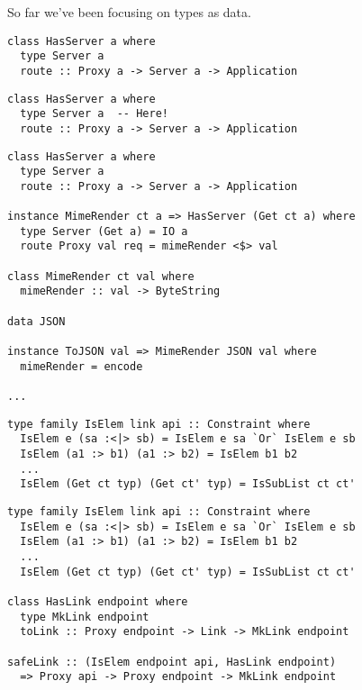 \documentclass{beamer}
\begin{document}
\begin{frame}
So far we've been focusing on types as data.
\end{frame}

\begin{frame}[fragile]
\begin{verbatim}
class HasServer a where
  type Server a
  route :: Proxy a -> Server a -> Application

\end{verbatim}
\end{frame}

\begin{frame}[fragile]
\begin{verbatim}
class HasServer a where
  type Server a  -- Here!
  route :: Proxy a -> Server a -> Application

\end{verbatim}
\end{frame}

\begin{frame}[fragile]
\begin{verbatim}
class HasServer a where
  type Server a
  route :: Proxy a -> Server a -> Application

instance MimeRender ct a => HasServer (Get ct a) where
  type Server (Get a) = IO a
  route Proxy val req = mimeRender <$> val

class MimeRender ct val where
  mimeRender :: val -> ByteString

data JSON

instance ToJSON val => MimeRender JSON val where
  mimeRender = encode

...
\end{verbatim}
\end{frame}

\begin{frame}[fragile]
\begin{verbatim}
type family IsElem link api :: Constraint where
  IsElem e (sa :<|> sb) = IsElem e sa `Or` IsElem e sb
  IsElem (a1 :> b1) (a1 :> b2) = IsElem b1 b2
  ...
  IsElem (Get ct typ) (Get ct' typ) = IsSubList ct ct'
\end{verbatim}
\end{frame}


\begin{frame}[fragile]
\begin{verbatim}
type family IsElem link api :: Constraint where
  IsElem e (sa :<|> sb) = IsElem e sa `Or` IsElem e sb
  IsElem (a1 :> b1) (a1 :> b2) = IsElem b1 b2
  ...
  IsElem (Get ct typ) (Get ct' typ) = IsSubList ct ct'

class HasLink endpoint where
  type MkLink endpoint
  toLink :: Proxy endpoint -> Link -> MkLink endpoint

safeLink :: (IsElem endpoint api, HasLink endpoint)
  => Proxy api -> Proxy endpoint -> MkLink endpoint
\end{verbatim}
\end{frame}
\end{document}
